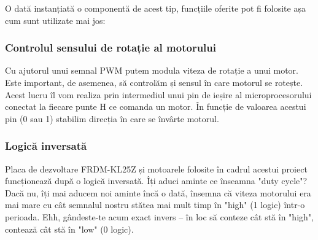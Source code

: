 O dată instanțiată o componentă de acest tip, funcțiile oferite pot fi folosite așa cum sunt utilizate mai jos:



\subsubsection{Controlul sensului de rotație al motorului}

Cu ajutorul unui semnal PWM putem modula viteza de rotație a unui motor. Este important, de asemenea, să controlăm și sensul în care motorul se rotește. Acest lucru îl vom realiza prin intermediul unui pin de ieșire al microprocesorului conectat la fiecare punte H ce comanda un motor. În funcție de valoarea acestui pin (0 sau 1) stabilim direcția în care se învârte motorul.

\subsubsection{Logică inversată}

Placa de dezvoltare FRDM-KL25Z și motoarele folosite în cadrul acestui proiect funcționează după o logică inversată. Îți aduci aminte ce înseamna "duty cycle"? Dacă nu, îți mai aducem noi aminte încă o dată, însemna că viteza motorului era mai mare cu cât semnalul nostru stătea mai mult timp în "high" (1 logic) într-o perioada. Ehh, gândeste-te acum exact invers – în loc să conteze cât stă în "high", contează cât stă în "low" (0 logic).

